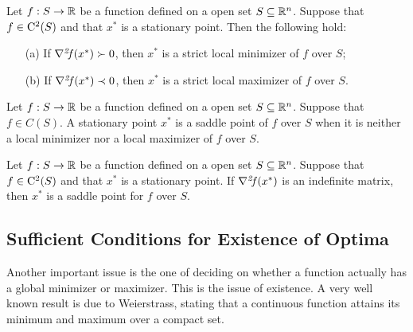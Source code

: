 \documentclass[10pt,a4paper]{article}
\begin{document}
\begin{theorem}\label{thm:suff_second_order_optimality}
	Let $f:S\to \mathbb{R}$ be a function defined on a open set $S\subseteq \mathbb{R}^n$. Suppose that $f\in\mathord{\mathrm{C^2}}(S)$ and that $x^*$ is a stationary point. Then the following hold:
	\begin{itemize}
		\item[(a)] If $\operatorname*{\mathit{\nabla^2 \!f}} (x^*)\succ 0$, then $x^*$ is a strict local minimizer of $f$ over $S$;
		\item[(b)] If  $\operatorname*{\mathit{\nabla^2 \!f}} (x^*)\prec 0$, then $x^*$ is a strict local maximizer of $f$ over $S$.
	\end{itemize}
\end{theorem}

\begin{definition}
	Let $f:S\to \mathbb{R}$ be a function defined on a open set $S\subseteq \mathbb{R}^n$. Suppose that $f\in C(S)$. A stationary point $x^*$ is a saddle point of $f$ over $S$ when it is neither a local minimizer nor a local maximizer of $f$ over $S$.
\end{definition}

\begin{theorem}
	Let $f:S\to \mathbb{R}$ be a function defined on a open set $S\subseteq \mathbb{R}^n$. Suppose that $f\in\mathord{\mathrm{C^2}}(S)$ and that $x^*$ is a stationary point. If $\operatorname*{\mathit{\nabla^2 \!f}}(x^*)$ is an indefinite matrix, then $x^*$ is a saddle point for $f$ over $S$.
\end{theorem}



\subsection{Sufficient Conditions for Existence of Optima}
Another important issue is the one of deciding on whether a function actually has a
global minimizer or maximizer. This is the issue of existence. A very well known result is due to Weierstrass, stating that a continuous function attains its minimum and maximum over a compact set.
\end{document}
